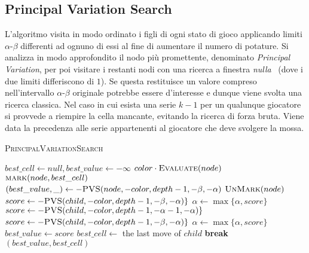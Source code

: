 \documentclass{article}
\begin{document}
\subsection{Principal Variation Search}

L'algoritmo visita in modo ordinato i figli di ogni stato di gioco applicando
limiti $\alpha$-$\beta$ differenti ad ognuno di essi al fine di aumentare il numero di potature.
Si analizza in modo approfondito il nodo pi\`u promettente, denominato \emph{Principal
Variation}, per poi visitare i restanti nodi con una ricerca a finestra \emph{nulla}~\cite{scout}
(dove i due limiti differiscono di $1$). Se questa restituisce un valore compreso
nell'intervallo $\alpha$-$\beta$ originale potrebbe essere d'interesse e dunque viene
svolta una ricerca classica.
Nel caso in cui esista una serie $k-1$ per un qualunque giocatore si provvede a
riempire la cella mancante, evitando la ricerca di forza bruta. Viene data la
precedenza alle serie appartenenti al giocatore che deve svolgere la mossa.

\begin{algorithm}[H]
  \caption{\textsc{PrincipalVariationSearch}}
  \label{alg:pvs}
  \begin{algorithmic}[0]
      \State $best\_cell \gets null, best\_value \gets -\infty$
        \State \Return $color \cdot \Call{Evaluate}{node}$
        \State $\Call{mark}{node, best\_cell}$
        \State $(best\_value, \_) \gets -\Call{PVS}{node, -color, depth-1, -\beta, -\alpha}$
        \State $\Call{UnMark}{node}$
      \Else
            \State $score \gets -\Call{PVS}{child, -color, depth-1, -\beta, -\alpha}\}$
            \State $\alpha \gets \max\{\alpha, score\}$
          \Else
            \State $score \gets -\Call{PVS}{child, -color, depth-1, -\alpha-1, -\alpha}\}$
              \State $score \gets -\Call{PVS}{child, -color, depth-1, -\beta, -\alpha}\}$
              \State $\alpha \gets \max\{\alpha, score\}$
            \EndIf
          \EndIf
            \State $best\_value \gets score$
            \State $best\_cell \gets $ the last move of $child$
          \EndIf
            \State \textbf{break}
          \EndIf
        \EndFor
      \EndIf
      \State \Return $(best\_value, best\_cell)$
    \EndProcedure
  \end{algorithmic}
\end{algorithm}
\end{document}
